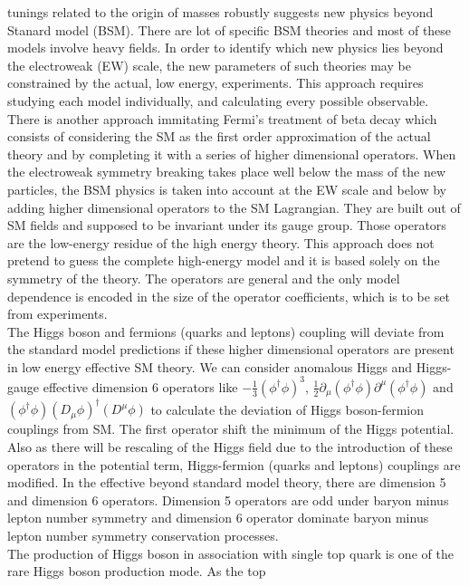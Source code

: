 \documentclass[final,3p]{CSP}
\begin{document}
tunings related to the origin of 
masses robustly suggests new physics beyond Stanard model (BSM). There are lot of specific 
BSM theories and most of these 
models involve heavy fields. In order to identify which new physics lies beyond the 
electroweak (EW) scale, the new parameters 
of such theories may be constrained by the actual, low energy, experiments. This approach 
requires studying each model 
individually, and calculating every possible observable. There is another approach immitating 
Fermi's treatment of beta decay 
which consists of considering the SM as the first order approximation of the actual theory 
and by completing it with a series 
of higher dimensional operators. When the electroweak symmetry breaking takes place well 
below the mass of the new particles, 
the BSM physics is taken into account at the EW scale and below by adding higher dimensional 
operators to the SM Lagrangian. 
They are built out of SM fields and supposed to be invariant under its gauge group. Those 
operators are the low-energy residue 
of the high energy theory. This approach does not pretend to guess the complete high-energy 
model and it is based solely on 
the symmetry of the  theory. The operators are general and the only model dependence is 
encoded in the size of the operator 
coefficients, which is to be set from experiments. \\
The Higgs boson and fermions (quarks and leptons) coupling will deviate from the standard 
model predictions if these higher 
dimensional operators are present in low energy effective SM theory. We can consider 
anomalous Higgs and Higgs-gauge effective 
dimension 6 operators like $-\frac{1}{3}(\phi^{\dagger}\phi)^3$, $\frac{1}{2} \partial_{\mu} 
(\phi^{\dagger} \phi) 
\partial^{\mu}(\phi^{\dagger} \phi)$ and $(\phi^{\dagger} \phi)(D_{\mu} \phi)^{\dagger} 
(D^{\mu} \phi)$ to calculate the 
deviation of Higgs boson-fermion couplings from SM. The first operator shift the minimum of 
the Higgs potential. Also as there 
will be rescaling of the Higgs field due to the introduction of these operators in the 
potential term, Higgs-fermion (quarks 
and leptons) couplings are modified. In the effective beyond standard model theory, there are 
dimension 5 and dimension 6 
operators. Dimension 5 operators are odd under baryon minus lepton number symmetry and 
dimension 6 operator dominate baryon 
minus lepton number symmetry conservation processes. \\
The production of Higgs boson in association with single top quark is one of the rare Higgs 
boson production mode. As the top 
\end{document}
